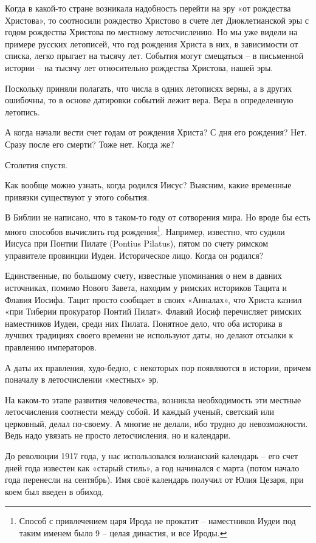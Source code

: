 Когда в какой-то стране возникала надобность перейти на эру «от рождества Христова», то соотносили рождество Христово в счете лет Диоклетианской эры с годом рождества Христова по местному летосчислению. Но мы уже видели на примере русских летописей, что год рождения Христа в них, в зависимости от списка, легко прыгает на тысячу лет. События могут смещаться – в письменной истории – на тысячу лет относительно рождества Христова, нашей эры. 

Поскольку приняли полагать, что числа в одних летописях верны, а в других ошибочны, то в основе датировки событий лежит вера. Вера в определенную летопись.

А когда начали вести счет годам от рождения Христа? С дня его рождения? Нет. Сразу после его смерти? Тоже нет. Когда же?

Столетия спустя.

Как вообще можно узнать, когда родился Иисус?  Выясним, какие временные привязки существуют у этого события.

В Библии не написано, что в таком-то году от сотворения мира. Но вроде бы есть много способов  вычислить год рождения\footnote{Способ с привлечением царя Ирода не прокатит – наместников Иудеи под таким именем было 9 – целая династия, и все Ироды.}. Например, известно, что судили Иисуса при Понтии Пилате (Pontius Pilatus), пятом по счету римском управителе провинции Иудеи. Историческое лицо. Когда он родился? 

Единственные, по большому счету, известные упоминания о нем в давних источниках, помимо Нового Завета, находим у римских историков Тацита и Флавия Иосифа. Тацит просто сообщает в своих «Анналах», что Христа казнил «при Тиберии прокуратор Понтий Пилат». Флавий Иосиф перечисляет римских наместников Иудеи, среди них Пилата. Понятное дело, что оба историка в лучших традициях своего времени не используют даты, но делают отсылки к правлению императоров.

А даты их правления, худо-бедно, с некоторых пор появляются в истории, причем поначалу в летосчислении «местных» эр.

На каком-то этапе развития человечества, возникла необходимость эти местные летосчисления соотнести между собой. И каждый ученый, светский или церковный, делал по-своему. А многие не делали, ибо трудно до невозможности. Ведь надо увязать не просто летосчисления, но и календари.

До революции 1917 года, у нас использовался юлианский календарь – его счет дней года известен как «старый стиль», а год начинался с марта (потом начало года перенесли на сентябрь). Имя своё календарь получил от Юлия Цезаря, при коем был введен в обиход.

